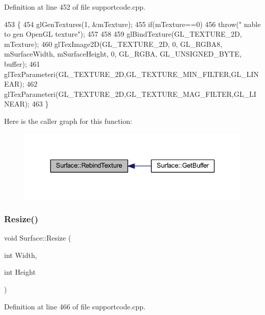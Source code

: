 Definition at line 452 of file supportcode.\+cpp.


\begin{DoxyCode}
453 \{
454     glGenTextures(1, &mTexture);
455     \textcolor{keywordflow}{if}(mTexture==0)
456         \textcolor{keywordflow}{throw}(\textcolor{stringliteral}{" nable to gen OpenGL texture"});
457 
458 
459     glBindTexture(GL\_TEXTURE\_2D, mTexture);
460     glTexImage2D(GL\_TEXTURE\_2D, 0, GL\_RGBA8, mSurfaceWidth, mSurfaceHeight, 0, GL\_RGBA, GL\_UNSIGNED\_BYTE, 
      buffer);
461     glTexParameteri(GL\_TEXTURE\_2D,GL\_TEXTURE\_MIN\_FILTER,GL\_LINEAR);
462     glTexParameteri(GL\_TEXTURE\_2D,GL\_TEXTURE\_MAG\_FILTER,GL\_LINEAR);
463 \}
\end{DoxyCode}
Here is the caller graph for this function\+:\nopagebreak
\begin{figure}[H]
\begin{center}
\leavevmode
\includegraphics[width=330pt]{class_surface_aa75c49f53fec5c49ba8422c0d64815e6_icgraph}
\end{center}
\end{figure}
\mbox{\label{class_surface_a5e45e936e3057fa1ddad0c7924767005}} 
\subsubsection{\texorpdfstring{Resize()}{Resize()}}
{\footnotesize\ttfamily void Surface\+::\+Resize (\begin{DoxyParamCaption}\item[{int}]{Width,  }\item[{int}]{Height }\end{DoxyParamCaption})}



Definition at line 466 of file supportcode.\+cpp.


